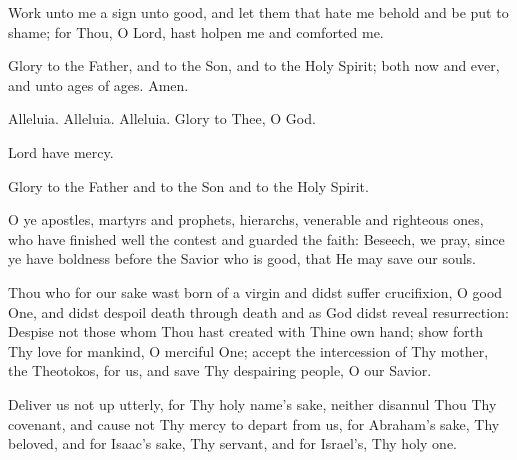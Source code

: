 {\begin{maybetwocolumns}





Work unto me a sign unto good, and let them that hate me behold and be put to shame;
for Thou, O Lord, hast holpen me and comforted me.

\end{maybetwocolumns}

\begin{reader}
  \item Glory to the Father, and to the Son, and to the Holy Spirit;
    both now and ever, and unto ages of ages. Amen.
  \item Alleluia. Alleluia. Alleluia. Glory to Thee, O God. 
  \item Lord have mercy. 
  \item Glory to the Father and to the Son and to the Holy Spirit.
\end{reader}

\begin{maybetwocolumns}
O ye apostles, martyrs and prophets, hierarchs,
venerable and righteous ones, who have 
finished well the contest and guarded the faith:
Beseech, we pray, since ye have boldness 
before the Savior who is good, that He may save our souls.



Thou who for our sake wast born of a virgin and didst suffer crucifixion,
O good One, 
and didst despoil death through death and as God didst reveal resurrection:
Despise not those whom Thou hast created with Thine own hand;
show forth Thy love for mankind,
O merciful One; accept the intercession of Thy mother, the Theotokos,
for us, and save Thy despairing people, O our Savior.

\vbox{}
Deliver us not up utterly, for Thy holy name’s sake,
neither disannul Thou Thy covenant, 
and cause not Thy mercy to depart from us,
for Abraham’s sake, Thy beloved,
and for Isaac’s sake, Thy servant,
and for Israel’s, Thy holy one.
\end{maybetwocolumns}



}
